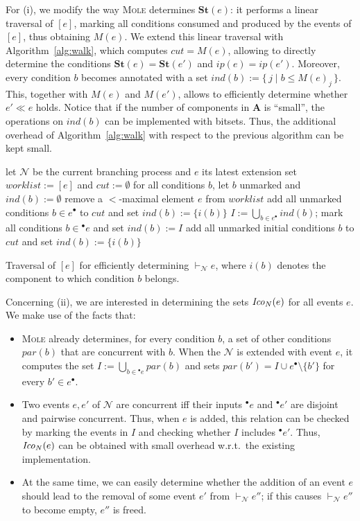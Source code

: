 \documentclass{llncs}
\def\prod{\mathbf{A}}
\newcommand{\inp}[1]{{}^\bullet\!{#1}}
\newcommand{\out}[1]{{#1}^\bullet}
\def\N{\mathcal{N}}
\def\scause{\ll}
\newcommand{\st}[1]{\mathbf{St}(#1)}
\newcommand{\past}[1]{[#1]}
\newcommand{\ma}[1]{M(#1)}
\newcommand{\Coni}[2]{{\it Ico}_{#1}(#2)}
\def\blocks{\vdash_{\!\N}}
\def\rblocks{\mathord{\blocks}}
\def\ind#1{\mathit{ind}(#1)}
\def\parb#1{\mathit{par}(#1)}
\def\worklist{\mathit{worklist}}
\begin{document}
For (i), we modify the way \textsc{Mole} determines $\st{e}$:
it performs a linear traversal of $\past{e}$, marking all conditions
consumed and produced by the events of $\past{e}$, thus obtaining $\ma{e}$.
We extend this linear traversal with Algorithm~\ref{alg:walk}, which computes
$\mathit{cut}=\ma{e}$, allowing to directly determine the conditions
$\st{e}=\st{e'}$
and $ip(e)=ip(e')$. Moreover, every condition $b$ becomes annotated with
a set $\ind{b}:=\{\,j\mid b\le \ma{e}_j\,\}$.
This, together with $\ma{e}$ and $\ma{e'}$, allows
to efficiently determine whether $e'\scause e$ holds. Notice that if the
number of components in $\prod$ is ``small'', the operations on $\ind{b}$
can be implemented with bitsets. Thus, the additional overhead of
Algorithm~\ref{alg:walk} with respect to the previous algorithm can be
kept small.

\begin{algorithm}[htbp]
\begin{algorithmic}
\State let $\N$ be the current branching process and $e$ its latest extension
\State set $\worklist:=\past{e}$ and $\mathit{cut}:=\emptyset$
\State for all conditions $b$, let $b$ unmarked and $\ind{b}:=\emptyset$
\While{$\worklist\ne\emptyset$}
\State remove a $<$-maximal element $e$ from $\worklist$
\State add all unmarked conditions $b\in\out{e}$ to $\mathit{cut}$ and set $\ind{b}:=\{i(b)\}$
\State $I:=\bigcup_{b\in\out{e}}\ind{b}$;
\State mark all conditions $b\in\inp{e}$ and set $\ind{b}:=I$
\EndWhile
\State add all unmarked initial conditions $b$ to $\mathit{cut}$ and set $\ind{b}:=\{i(b)\}$
\end{algorithmic}
\caption{Traversal of $\past{e}$ for efficiently determining $\rblocks{e}$,
where $i(b)$ denotes the component to which condition $b$ belongs.}
\label{alg:walk}
\end{algorithm}

Concerning (ii), we are interested in determining the sets $\Coni{N}{e}$
for all events $e$. We make use of the facts that:
\begin{itemize}
\item \textsc{Mole} already determines, for every condition $b$, a set
  of other conditions $\parb{b}$ that are concurrent with $b$. When
  the $\N$ is extended with event $e$, it computes the set
  $I:=\bigcup_{b\in\inp{e}}\parb{b}$ and sets
  $\parb{b'}=I\cup\out{e}\setminus\{b'\}$ for every $b'\in\out{e}$.
\item Two events $e,e'$ of $\N$ are concurrent iff their inputs $\inp{e}$
  and $\inp{e'}$ are disjoint and pairwise concurrent. Thus, when $e$ is
  added, this relation can be checked by marking the events in $I$ and
  checking whether $I$ includes $\inp{e'}$. Thus, $\Coni{N}{e}$ can be
  obtained with small overhead w.r.t.\ the existing implementation.
\item At the same time, we can easily determine whether the addition
  of an event $e$ should lead to the removal of some event $e'$ from
  $\rblocks{e''}$; if this causes $\rblocks{e''}$ to become empty,
  $e''$ is freed.
\end{itemize}
\end{document}
